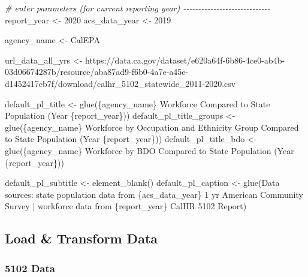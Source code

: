 \documentclass[
]{article}
\newenvironment{Shaded}{\begin{snugshade}}{\end{snugshade}}
\newcommand{\CommentTok}[1]{\textcolor[rgb]{0.56,0.35,0.01}{\textit{#1}}}
\newcommand{\DecValTok}[1]{\textcolor[rgb]{0.00,0.00,0.81}{#1}}
\newcommand{\FunctionTok}[1]{\textcolor[rgb]{0.00,0.00,0.00}{#1}}
\newcommand{\NormalTok}[1]{#1}
\newcommand{\OtherTok}[1]{\textcolor[rgb]{0.56,0.35,0.01}{#1}}
\newcommand{\StringTok}[1]{\textcolor[rgb]{0.31,0.60,0.02}{#1}}
\begin{document}
\begin{Shaded}
\begin{Highlighting}[]
\CommentTok{\# enter parameters (for current reporting year) {-}{-}{-}{-}{-}{-}{-}{-}{-}{-}{-}{-}{-}{-}{-}{-}{-}{-}{-}{-}{-}{-}{-}{-}{-}{-}{-}{-}{-}}
\NormalTok{report\_year }\OtherTok{\textless{}{-}} \DecValTok{2020}
\NormalTok{acs\_data\_year }\OtherTok{\textless{}{-}} \DecValTok{2019}

\NormalTok{agency\_name }\OtherTok{\textless{}{-}} \StringTok{\textquotesingle{}CalEPA\textquotesingle{}}

\NormalTok{url\_data\_all\_yrs }\OtherTok{\textless{}{-}} \StringTok{\textquotesingle{}https://data.ca.gov/dataset/e620a64f{-}6b86{-}4ce0{-}ab4b{-}03d06674287b/resource/aba87ad9{-}f6b0{-}4a7e{-}a45e{-}d1452417eb7f/download/calhr\_5102\_statewide\_2011{-}2020.csv\textquotesingle{}}

\NormalTok{default\_pl\_title }\OtherTok{\textless{}{-}} \FunctionTok{glue}\NormalTok{(}\StringTok{\textquotesingle{}\{agency\_name\} Workforce Compared to State Population (Year \{report\_year\})\textquotesingle{}}\NormalTok{)}
\NormalTok{default\_pl\_title\_groups }\OtherTok{\textless{}{-}} \FunctionTok{glue}\NormalTok{(}\StringTok{\textquotesingle{}\{agency\_name\} Workforce by Occupation and Ethnicity Group Compared to State Population (Year \{report\_year\})\textquotesingle{}}\NormalTok{)}
\NormalTok{default\_pl\_title\_bdo }\OtherTok{\textless{}{-}} \FunctionTok{glue}\NormalTok{(}\StringTok{\textquotesingle{}\{agency\_name\} Workforce by BDO Compared to State Population (Year \{report\_year\})\textquotesingle{}}\NormalTok{)}

\NormalTok{default\_pl\_subtitle }\OtherTok{\textless{}{-}} \FunctionTok{element\_blank}\NormalTok{()}
\NormalTok{default\_pl\_caption }\OtherTok{\textless{}{-}} \FunctionTok{glue}\NormalTok{(}\StringTok{\textquotesingle{}Data sources: state population data from \{acs\_data\_year\} 1 yr American Community Survey  |  workforce data from \{report\_year\} CalHR 5102 Report\textquotesingle{}}\NormalTok{)}
\end{Highlighting}
\end{Shaded}

\hypertarget{load-transform-data}{%
\subsection{Load \& Transform Data}\label{load-transform-data}}

\hypertarget{data}{%
\subsubsection{5102 Data}\label{data}}
\end{document}
